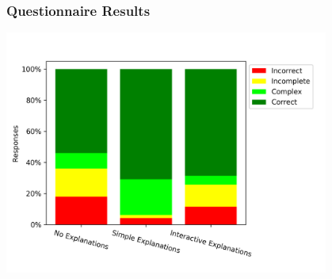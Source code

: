 \documentclass[11pt]{beamer}
\begin{document}
\begin{frame}
\begin{columns}
\begin{column}{0.5\textwidth}
\begin{center}
				\end{center}
			\end{column}
		\end{columns}
	\end{frame}

	\begin{frame}
		\frametitle{Questionnaire Results}
		\begin{center}
			\includegraphics[width=0.8\textwidth]{figures/questionnaire_results_summary.png}
		\end{center}
	\end{frame}
\end{document}

